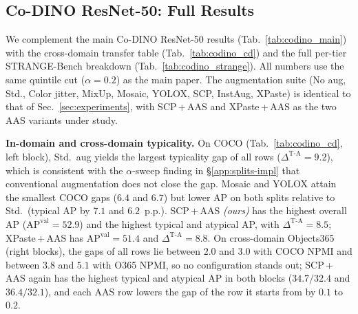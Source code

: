 \subsection{Co-DINO ResNet-50: Full Results}
\label{app:codino_full}

We complement the main Co-DINO ResNet-50 results (Tab.~\ref{tab:codino_main}) with the cross-domain transfer table (Tab.~\ref{tab:codino_cd}) and the full per-tier STRANGE-Bench breakdown (Tab.~\ref{tab:codino_strange}). All numbers use the same quintile cut ($\alpha = 0.2$) as the main paper. The augmentation suite (No aug, Std., Color jitter, MixUp, Mosaic, YOLOX, SCP, InstAug, XPaste) is identical to that of Sec.~\ref{sec:experiments}, with SCP\,+\,AAS and XPaste\,+\,AAS as the two AAS variants under study. 

\begin{table}[!htp]%
\centering
\footnotesize
\setlength{\tabcolsep}{4pt}
\caption{\textbf{Co-DINO ResNet-50: in-domain (COCO) and cross-domain
(Objects365) typicality.} SCP\,+\,AAS \emph{(ours)} has the highest typical and atypical AP on all three splits. On Objects365 the gap hardly depends on the augmentation ($2.0$ to $3.0$~p.p.\@ with COCO NPMI) and is $1.6$ to $2.3$ times larger for every row when the pairs are ranked by Objects365's own NPMI ($3.8$ to $5.1$~p.p.\@). Full-annotation bbox mAP (\%) on the quintile paired splits of COCO val and Objects365 val, the latter split by COCO \texttt{train2017} NPMI or by NPMI recomputed on Objects365 train (App.~\ref{app:exp-datasets}); rows as in Tab.~\ref{tab:codino_main}. Best per column in \textbf{bold}, second-best \underline{underlined}.}
\label{tab:codino_cd}

\end{table}

\noindent\textbf{In-domain and cross-domain typicality.} On COCO (Tab.~\ref{tab:codino_cd}, left block), Std.\ aug yields the largest typicality gap of all rows ($\Delta^{\text{T-A}} = 9.2$), which is consistent with the $\alpha$-sweep finding in \S\ref{app:splits-impl} that conventional augmentation does not close the gap. Mosaic and YOLOX attain the smallest COCO gaps ($6.4$ and $6.7$) but lower AP on both splits relative to Std.\ (typical AP by $7.1$ and $6.2$~p.p.\@). SCP\,+\,AAS \emph{(ours)} has the highest overall AP ($\text{AP}^{\text{val}} = 52.9$) and the highest typical and atypical AP, with $\Delta^{\text{T-A}} = 8.5$; XPaste\,+\,AAS has $\text{AP}^{\text{val}} = 51.4$ and $\Delta^{\text{T-A}} = 8.8$. On cross-domain Objects365 (right blocks), the gaps of all rows lie between $2.0$ and $3.0$ with COCO NPMI and between $3.8$ and $5.1$ with O365 NPMI, so no configuration stands out; SCP\,+\,AAS again has the highest typical and atypical AP in both blocks ($34.7 / 32.4$ and $36.4 / 32.1$), and each AAS row lowers the gap of the row it starts from by $0.1$ to $0.2$.

